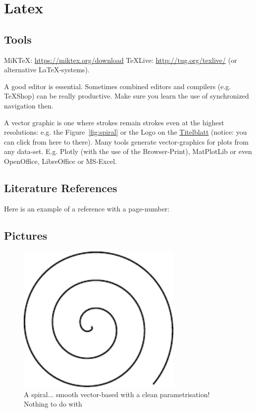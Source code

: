 \chapter{Latex}

\section{Tools}

MiKTeX: \url{https://miktex.org/download}
TeXLive: \url{http://tug.org/texlive/}
 (or alternative LaTeX-systems).
 
 A good editor is essential. Sometimes combined editors and compilers (e.g. TeXShop) can be really productive. Make sure you learn the use of synchronized navigation then.

A vector graphic is one where strokes remain strokes even at the highest resolutions: e.g. the Figure~\eqref{fig:spiral} or the Logo on the \hyperref[titlePage]{Titelblatt} (notice: you can click from here to there).
Many tools generate vector-graphics for plots from any data-set. E.g. Plotly (with the use of the Browser-Print), MatPlotLib or even OpenOffice, LibreOffice or MS-Excel.

\section{Literature References}
Here is an example of a reference with a page-number: \cite[S. 6]{DueckKo:2016}


\section{Pictures}

\begin{figure}[h]
\centering
\includegraphics[width=8cm]{pics/spiral.pdf}
\caption{A spiral... smooth vector-based with a clean parametrisation! \\ Nothing to do with \cite{Gage:18}}\label{fig:spiral}
\end{figure}
\FloatBarrier

